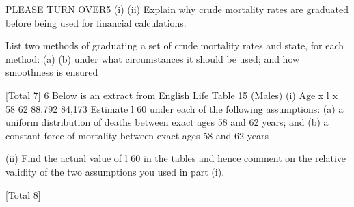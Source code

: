 \documentclass[a4paper,12pt]{article}
\begin{document}
\begin{enumerate}
[Total 7]
PLEASE TURN OVER5
(i)
(ii)
Explain why crude mortality rates are graduated before being used for
financial calculations.

List two methods of graduating a set of crude mortality rates and state, for
each method:
(a)
(b)
under what circumstances it should be used; and
how smoothness is ensured

[Total 7]
6
Below is an extract from English Life Table 15 (Males)
(i)
Age x l x
58
62 88,792
84,173
Estimate l 60 under each of the following assumptions:
(a) a uniform distribution of deaths between exact ages 58 and 62 years;
and
(b) a constant force of mortality between exact ages 58 and 62 years

(ii)
Find the actual value of l 60 in the tables and hence comment on the relative
validity of the two assumptions you used in part (i).

[Total 8]


\end{enumerate}
\end{document}
